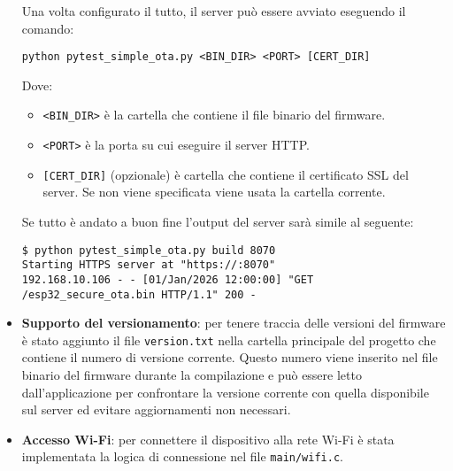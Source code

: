 \documentclass[a4paper]{article}
\begin{document}
\begin{itemize}
    Una volta configurato il tutto, il server può essere avviato eseguendo il comando:
\begin{lstlisting}
python pytest_simple_ota.py <BIN_DIR> <PORT> [CERT_DIR]
\end{lstlisting}
    Dove:
    \begin{itemize}
      \item \texttt{<BIN\_DIR>} è la cartella che contiene il file binario del firmware.
      \item \texttt{<PORT>} è la  porta su cui eseguire il server HTTP.
      \item \texttt{[CERT\_DIR]} (opzionale) è cartella che contiene il certificato SSL
        del server. Se non viene specificata viene usata la cartella corrente.
    \end{itemize}
    Se tutto è andato a buon fine l'output del server sarà simile al seguente:
\begin{lstlisting}
$ python pytest_simple_ota.py build 8070
Starting HTTPS server at "https://:8070"
192.168.10.106 - - [01/Jan/2026 12:00:00] "GET /esp32_secure_ota.bin HTTP/1.1" 200 -
\end{lstlisting}

  \item \textbf{Supporto del versionamento}: per tenere traccia delle versioni del firmware
    è stato aggiunto il file \texttt{version.txt} nella cartella principale del progetto
    che contiene il numero di versione corrente. Questo numero viene inserito nel
    file binario del firmware durante la compilazione e può essere letto dall'applicazione
    per confrontare la versione corrente con quella disponibile sul server ed evitare
    aggiornamenti non necessari.

  \item \textbf{Accesso Wi-Fi}: per connettere il dispositivo alla rete Wi-Fi è stata
    implementata la logica di connessione nel file \texttt{main/wifi.c}.


\end{itemize}
\end{document}
